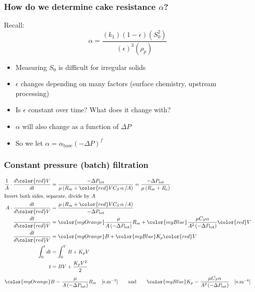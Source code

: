\begin{frame}\frametitle{How do we determine cake resistance $\alpha$?}
	Recall:
	\[ \alpha = \dfrac{(k_1) \left(1-\epsilon\right)(S_0^2)}{(\epsilon)^3 (\rho_p)} \]
	\begin{itemize}
		\item	Measuring $S_0$ is difficult for irregular solids
		\item	$\epsilon$ changes depending on many factors (surface chemistry, upstream processing)
		\item	Is $\epsilon$ constant over time? What does it change with?
		\item	$\alpha$ will also change as a function of $\Delta P$
		\item	So we let $\alpha = \alpha_\text{base} \left(-\Delta P\right)^f$
	\end{itemize}

\end{frame}

\begin{frame}\frametitle{Constant pressure (batch) filtration}
	\begin{align*}
	   \dfrac{1}{A} \cdot \dfrac{d{\color{red}V}}{dt} &= \dfrac{-\Delta P_\text{tot}}{\mu \left(R_m + {\color{red}V} C_S \, \mathbf{ \alpha}\, / A \right)} =  \dfrac{-\Delta P_\text{tot}}{\mu \left(R_m + R_c \right)}\\
	   \intertext{Invert both sides, separate, divide by $A$}
	   A \cdot \dfrac{dt}{d{\color{red}V}} &= \dfrac{\mu \left(R_m + {\color{red}V}  C_S \, \mathbf{ \alpha}\, / A \right)}{-\Delta P_\text{tot}}\\
	   \dfrac{dt}{d{\color{red}V}} &= {\color{myOrange}\dfrac{\mu}{A\left(-\Delta P_\text{tot}\right)} R_m} + {\color{myBlue}\dfrac{\mu C_S \alpha  }{A^2 \left(-\Delta P_\text{tot}\right)}}{\color{red}V}\\
	   \dfrac{dt}{d{\color{red}V}} &= {\color{myOrange}B} + {\color{myBlue}K_p}{\color{red}V}\\
	   \int_{0}^{t}{dt} &= \int_{0}^{V}{B + K_pV}\\
	   t &= BV +  \dfrac{K_pV^2}{2}
	\end{align*}
	${\color{myOrange}B = \dfrac{\mu}{A\left(-\Delta P_\text{tot}\right)} R_m \quad [\text{s.m}^{-3}]} \qquad \text{and} \qquad {\color{myBlue}K_p = \dfrac{\mu C_S \alpha  }{A^2 \left(-\Delta P_\text{tot}\right)} \quad [\text{s.m}^{-6}]}$
\end{frame}

